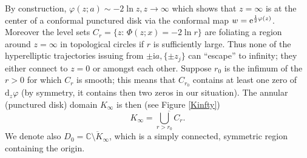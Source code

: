 \documentclass[10pt,reqno,oneside]{amsart}
\renewcommand{\d}{{\mathrm d}}
\newcommand{\im}{\mathrm{i}}
\numberwithin{equation}{section}
\def\be{\begin{equation}}
\def\ee{\end{equation}}
\def\ov {\overline}
\def\C{{\mathbb C}}
\begin{document}
By construction, $\varphi(z;a)\sim -2\ln z, z\rightarrow\infty$ which shows that $z=\infty$ is at the center of a conformal punctured disk via the conformal map $w = {\rm e}^{\frac{1}{2}\varphi(z)}$. Moreover the level sets $C_r= \{z:\,\Phi(z;x) = -2\ln r\}$ are foliating a region around $z=\infty$ in topological circles if $r$ is sufficiently large. Thus none of the hyperelliptic trajectories issuing from $\pm\im a, \{\pm z_j\}$ can ``escape'' to infinity; they either connect to $z=0$ or amongst each other.
Suppose $r_0$ is the infimum of the $r>0$ for which $C_r$ is smooth; this means that $C_{r_0}$ contains at least one zero of $\d_z\varphi$ (by symmetry, it contains then two zeros in our situation). The annular (punctured disk) domain $K_\infty$ is then (see Figure \ref{Kinfty})
\be
K_\infty= \ov {\bigcup_{r>r_0} C_{r}}.
\ee
We denote also $D_0= \ov {\C \setminus K_\infty}$, which is a simply connected, symmetric region containing the origin.\smallskip
\end{document}
